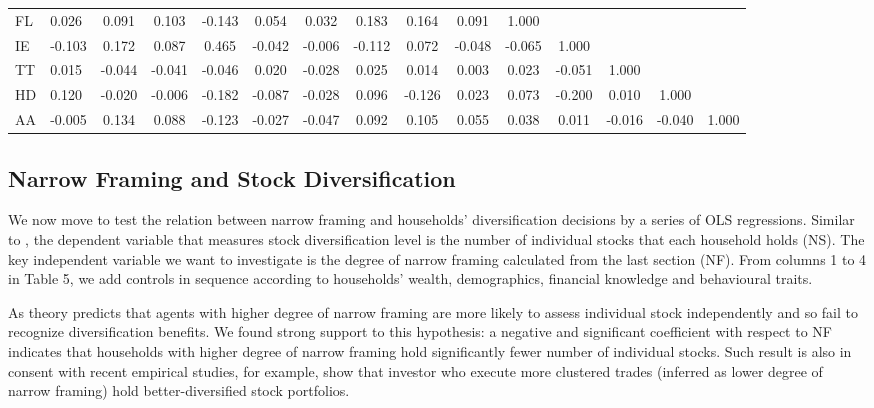 \documentclass[ukenglish,nottitlepage,thmsb,11pt,letterpaper]{article}
\begin{document}
\begin{sidewaystable}
\begin{tabular*}{\textwidth}{l @{\extracolsep{\fill}} lccccccccccccc}
	FL           & 0.026        & 0.091        & 0.103        & -0.143       & 0.054        & 0.032        & 0.183        & 0.164        & 0.091        & 1.000        &              &              &              &  \\
	IE           & -0.103       & 0.172        & 0.087        & 0.465        & -0.042       & -0.006       & -0.112       & 0.072        & -0.048       & -0.065       & 1.000        &              &              &  \\
	TT           & 0.015        & -0.044       & -0.041       & -0.046       & 0.020        & -0.028       & 0.025        & 0.014        & 0.003        & 0.023        & -0.051       & 1.000        &              &  \\
	HD           & 0.120        & -0.020       & -0.006       & -0.182       & -0.087       & -0.028       & 0.096        & -0.126       & 0.023        & 0.073        & -0.200       & 0.010        & 1.000        &  \\
	AA           & -0.005       & 0.134        & 0.088        & -0.123       & -0.027       & -0.047       & 0.092        & 0.105        & 0.055        & 0.038        & 0.011        & -0.016       & -0.040       & 1.000 \\
	\bottomrule
	
	\end{tabular*}%
	\label{t4}%
\end{sidewaystable}%
\newpage



 \subsection{Narrow Framing and Stock Diversification}


We now move to test the relation between narrow framing and households' diversification decisions by a series of OLS regressions. Similar to \cite{Goetzmann2008}, the dependent variable that measures stock diversification level is the number of individual stocks that each household holds (NS). The key independent variable we want to investigate is the degree of narrow framing calculated from the last section (NF). From columns 1 to 4 in Table 5, we add controls in sequence according to households' wealth, demographics, financial knowledge and behavioural traits. 

As theory predicts that agents with higher degree of narrow framing are more likely to assess individual stock independently and so fail to recognize diversification benefits. We found strong support to this hypothesis: a negative and significant coefficient with respect to NF indicates that households with higher degree of narrow framing hold significantly fewer number of individual stocks. Such result is also in consent with recent empirical studies, for example, \citet{Kumar2008} show that investor who execute more clustered trades (inferred as lower degree of narrow framing) hold better-diversified stock portfolios.  
\end{document}
